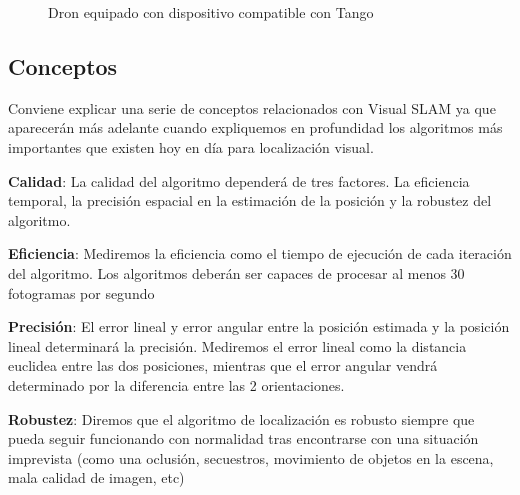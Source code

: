 \begin {enumerate}
\begin{figure}[H]
\begin{center}
\end{center}
\caption{Dron equipado con dispositivo compatible con Tango}
\end{figure}

\end {enumerate}



\subsection{Conceptos}

Conviene explicar una serie de conceptos relacionados con Visual SLAM ya que aparecerán más adelante cuando expliquemos en profundidad los algoritmos más importantes que existen hoy en día para localización visual.

\textbf{Calidad}: La calidad del algoritmo dependerá de tres factores. La eficiencia temporal, la precisión espacial en la estimación de la posición y la robustez del algoritmo.

\textbf{Eficiencia}: Mediremos la eficiencia como el tiempo de ejecución de cada iteración del algoritmo. Los algoritmos deberán ser capaces de procesar al menos 30 fotogramas por segundo

\textbf{Precisión}:  El error lineal y error angular entre la posición estimada y la posición lineal determinará la precisión. Mediremos el error lineal como la distancia euclidea entre las dos posiciones, mientras que el error angular vendrá determinado por la diferencia entre las 2 orientaciones.

\textbf{Robustez}: Diremos que el algoritmo de localización es robusto siempre que pueda seguir funcionando con normalidad tras encontrarse con una situación imprevista (como una oclusión, secuestros, movimiento de objetos en la escena, mala calidad de imagen, etc)

